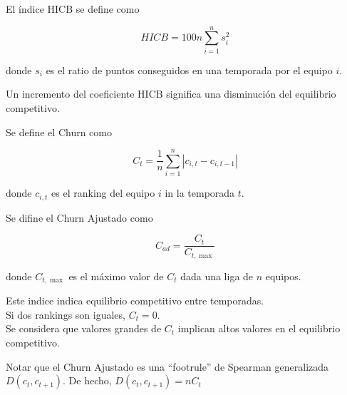 \begin{defi}
El índice HICB se define como

\[ HICB = 100n \sum_{i=1}^{n} s_i^2 \]

donde $s_i$ es el ratio de puntos conseguidos en una temporada por el equipo $i$.
\end{defi}

\begin{nota}
Un incremento del coeficiente HICB significa una disminución del equilibrio competitivo.
\end{nota}

\begin{defi}
Se define el Churn como

\[ C_t = \dfrac{1}{n} \sum_{i=1}^{n} |c_{i,t} - c_{i,t-1}| \]

donde $c_{i,t}$ es el ranking del equipo $i$ in la temporada $t$.
\end{defi}

\begin{defi}
Se difine el Churn Ajustado como

\[ C_{ad} = \dfrac{C_t}{C_{t, \max}} \]

donde $C_{t, \max}$ es el máximo valor de $C_t$ dada una liga de $n$ equipos.
\end{defi}

\begin{nota}
Este indice indica equilibrio competitivo entre temporadas.\\

Si dos rankings son iguales, $C_t = 0$.\\

Se considera que valores grandes de $C_t$ implican altos valores en el equilibrio competitivo. 
\end{nota}


\begin{nota}
Notar que el Churn Ajustado es una ``footrule'' de Spearman generalizada $D(c_t, c_{t+1})$. De hecho, $D(c_t, c_{t+1}) = nC_t$ 
\end{nota}

